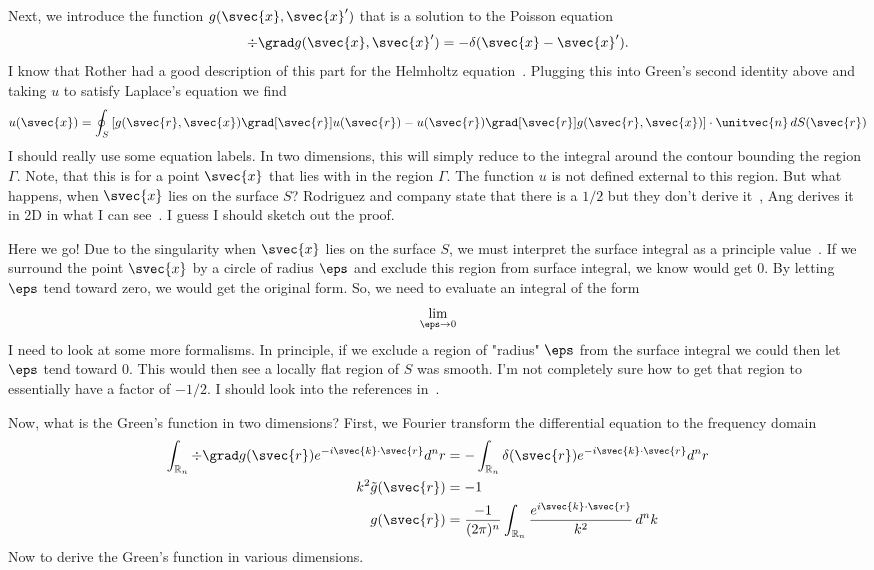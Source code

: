\documentclass[aps,prl,reprint]{revtex4-1}
\begin{document}
Next, we introduce the function \(g(\svec{x},\svec{x}')\) that is a
solution to the Poisson equation
\begin{equation*}
    \div\grad g(\svec{x},\svec{x}') = -\delta(\svec{x}-\svec{x}').
\end{equation*}
I know that Rother had a good description of this part for the Helmholtz
equation~\cite{rother_electromagnetic_2009}.  Plugging this into Green's
second identity above and taking \(u\) to satisfy Laplace's equation we
find
\begin{equation*}
    u(\svec{x}) = \oint_S \left[
        g(\svec{r},\svec{x})\grad[\svec{r}] u(\svec{r})
        -u(\svec{r})\grad[\svec{r}] g(\svec{r},\svec{x})
    \right] \cdot \unitvec{n} \, dS(\svec{r})
\end{equation*}
I should really use some equation labels.  In two dimensions, this will
simply reduce to the integral around the contour bounding the region
\(\Gamma\).  Note, that this is for a point \(\svec{x}\) that lies with
in the region \(\Gamma\).  The function \(u\) is not defined external to
this region.  But what happens, when \(\svec{x}\) lies on the surface
\(S\)?  Rodriguez and company state that there is a \(1/2\) but they
don't derive it~\cite{rodriguez_fluctuating-surface-current_2013}, Ang
derives it in 2D in what I can see~\cite{ang_beginners_2007}.  I guess I
should sketch out the proof.

Here we go!  Due to the singularity when \(\svec{x}\) lies on the
surface \(S\), we must interpret the surface integral as a principle
value~\cite{ang_beginners_2007}.  If we surround the point \(\svec{x}\)
by a circle of radius \(\eps\) and exclude this region from surface
integral, we know would get \(0\).  By letting \(\eps\) tend toward
zero, we would get the original form.  So, we need to evaluate an
integral of the form
\begin{equation*}
    \lim_{\eps\to0}
\end{equation*}
I need to look at some more formalisms.  In principle, if we exclude a
region of "radius" \(\eps\) from the surface integral we could then let
\(\eps\) tend toward \(0\).  This would then see a locally flat region
of \(S\) was smooth.  I'm not completely sure how to get that region to
essentially have a factor of \(-1/2\).  I should look into the
references in~\cite{rodriguez_fluctuating-surface-current_2013}.

Now, what is the Green's function in two dimensions?  First, we Fourier
transform the differential equation to the frequency domain
\begin{align*}
    \int_{\mathbb{R}_n} \div\grad g(\svec{r})
    e^{-i \svec{k}\cdot\svec{r}} d^nr &= -\int_{\mathbb{R}_n}
    \delta(\svec{r}) e^{-i\svec{k}\cdot\svec{r}} d^nr \\
    k^2 \tilde{g}(\svec{r}) &= -1 \\
    g(\svec{r}) &= \frac{-1}{(2\pi)^n} \int_{\mathbb{R}_n}
    \frac{e^{i\svec{k}\cdot\svec{r}}}{k^2} \, d^nk
\end{align*}
Now to derive the Green's function in various dimensions.
\end{document}
